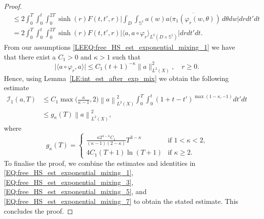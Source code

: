 \documentclass[10pt,a4paper]{amsart}
\newcommand{\norm}[1]{\left\lVert#1\right\rVert}
\renewcommand{\phi}{\varphi}
\begin{document}
\begin{proof}
\begin{equation*}
\begin{aligned}
        &\leq 2 \int_0^T\int_0^t \int_{0}^{2T} \sinh(r)F(t,t',r)  \Big| \int_{D}   \int_{\mathbb{S}^1 } a(w) \overline{a(\pi_1(\varphi_r(w,\theta))}  \,d \theta d w   \Big| d r   d t'd t
        \\
        &= 2 \int_0^T\int_0^t \int_{0}^{2T} \sinh(r)F(t,t',r)  \big| \langle a, a\circ \varphi_r\rangle_{L^2(D\times \mathbb{S}^1)}   \big| d r   d t'd t.
    \end{aligned}
\end{equation*}
From our assumptions \eqref{LEEQ:free_HS_est_exponential_mixing_1} we have that there exist a $C_1>0$ and $\kappa>1$ such that 
\begin{equation*}
  \big|\langle a \circ \phi_r, a \rangle \big| \leq C_1 (t+1)^{-\kappa} \lVert a \rVert_{L^2(X)}^2,\quad r \geq 0.  
\end{equation*}
Hence, using Lemma~\ref{LE:int_est_after_exp_mix} we obtain the following estimate
\begin{equation}\label{EQ:free_HS_est_exponential_mixing_7}
    \begin{aligned}
        \mathcal{I}_1(a,T)
        &\leq C_1 \max\big(\tfrac{\kappa}{\kappa-1},2\big)\norm{a}^2_{L^2(X)} \int_0^T\int_0^t (1+t-t')^{\max (1-\kappa,-1)}   d t'd t
        \\
        & \leq  g_\kappa(T) \norm{a}^2_{L^2(X)},
    \end{aligned}
\end{equation}
where
\begin{equation*}
    g_\kappa(T) = \begin{cases}
        \frac{\kappa 2^{4-\kappa} C_1}{(\kappa -1)(2-\kappa)} T^{3-\kappa} & \text{if $1<\kappa<2$,}\\
        4 C_1(T+1)\ln (T+1) & \text{if $\kappa\geq 2$.}
    \end{cases}        
\end{equation*}
To finalise the proof, we combine the estimates and identities in \eqref{EQ:free_HS_est_exponential_mixing_1}, \eqref{EQ:free_HS_est_exponential_mixing_3}, \eqref{EQ:free_HS_est_exponential_mixing_5}, and \eqref{EQ:free_HS_est_exponential_mixing_7} to obtain the stated estimate. This concludes the proof.    
\end{proof}
\end{document}
